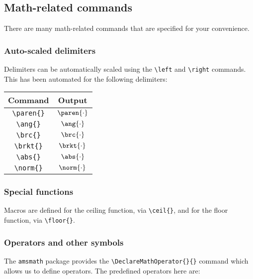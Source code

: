 \documentclass[letterpaper,12pt]{article}
\begin{document}
	\subsection{Math-related commands}
	There are many math-related commands that are specified for your convenience.
	
		\subsubsection{Auto-scaled delimiters}
		Delimiters can be automatically scaled using the \verb|\left| and \verb|\right| commands. This has been automated for the following delimiters:
		
		\begin{center}
		\begin{tabular}{c|c}
		Command & Output \\ \hline
		\verb|\paren{}| & $\paren{\cdot}$ \\
		\verb|\ang{}| & $\ang{\cdot}$ \\
		\verb|\brc{}| & $\brc{\cdot}$ \\
		\verb|\brkt{}| & $\brkt{\cdot}$ \\
		\verb|\abs{}| & $\abs{\cdot}$ \\
		\verb|\norm{}| & $\norm{\cdot}$ \\
		\end{tabular}
		\end{center}
		
		\subsubsection{Special functions}
		Macros are defined for the ceiling function, via \verb|\ceil{}|, and for the floor function, via \verb|\floor{}|.
		
		\subsubsection{Operators and other symbols}
		The \texttt{amsmath} package provides the \verb|\DeclareMathOperator{}{}| command which allows us to define operators. The predefined operators here are:
		
\end{document}

